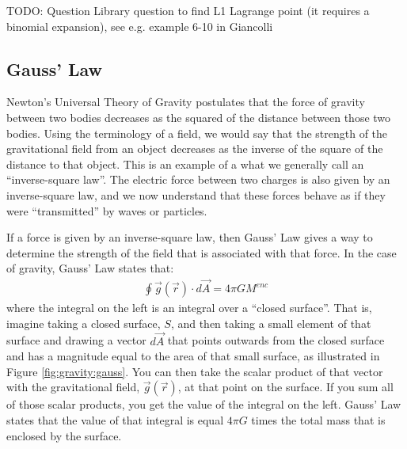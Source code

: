 TODO: Question Library question to find L1 Lagrange point (it requires a binomial expansion), see e.g. example 6-10 in Giancolli


\subsection{Gauss' Law}
Newton's Universal Theory of Gravity postulates that the force of gravity between two bodies decreases as the squared of the distance between those two bodies. Using the terminology of a field, we would say that the strength of the gravitational field from an object decreases as the inverse of the square of the distance to that object. This is an example of a what we generally call an ``inverse-square law''. The electric force between two charges is also given by an inverse-square law, and we now understand that these forces behave as if they were ``transmitted'' by waves or particles.

If a force is given by an inverse-square law, then Gauss' Law gives a way to determine the strength of the field that is associated with that force. In the case of gravity, Gauss' Law states that:
\begin{align*}
\oint \vec g(\vec r) \cdot d\vec A = 4\pi G M^{enc}
\end{align*}
where the integral on the left is an integral over a ``closed surface''. That is, imagine taking a closed surface, $S$, and then taking a small element of that surface and drawing a vector $d\vec A$ that points outwards from the closed surface and has a magnitude equal to the area of that small surface, as illustrated in Figure \ref{fig:gravity:gauss}. You can then take the scalar product of that vector with the gravitational field, $\vec g(\vec r)$, at that point on the surface. If you sum all of those scalar products, you get the value of the integral on the left. Gauss' Law states that the value of that integral is equal $4 \pi G$ times the total mass that is enclosed by the surface. 

